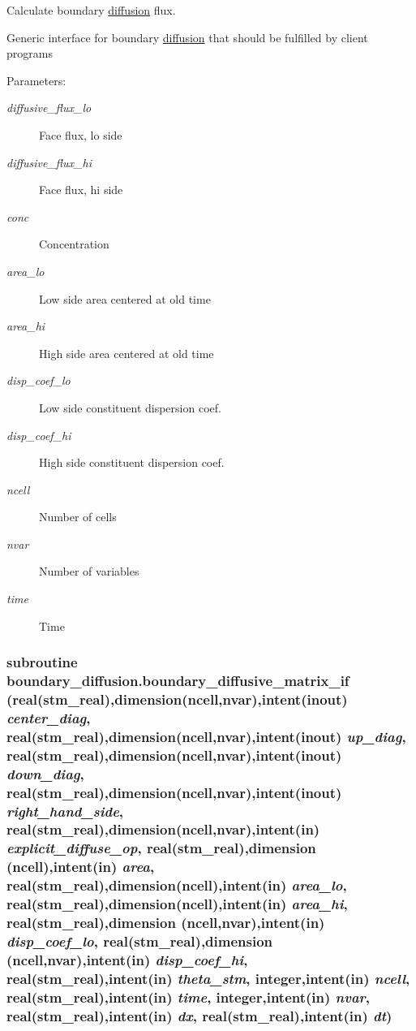 Calculate boundary \hyperlink{a00056}{diffusion} flux. 

Generic interface for boundary \hyperlink{a00056}{diffusion} that should be fulfilled by client programs \begin{Desc}
\item[Parameters:]
\begin{description}
\item[{\em diffusive\_\-flux\_\-lo}]Face flux, lo side\item[{\em diffusive\_\-flux\_\-hi}]Face flux, hi side\item[{\em conc}]Concentration \item[{\em area\_\-lo}]Low side area centered at old time\item[{\em area\_\-hi}]High side area centered at old time\item[{\em disp\_\-coef\_\-lo}]Low side constituent dispersion coef.\item[{\em disp\_\-coef\_\-hi}]High side constituent dispersion coef.\item[{\em ncell}]Number of cells\item[{\em nvar}]Number of variables\item[{\em time}]Time \end{description}
\end{Desc}
\hypertarget{a00054_beb2d03e4546ce0fc0a06c9840487f7d}{
\subsubsection[{boundary\_\-diffusive\_\-matrix\_\-if}]{\setlength{\rightskip}{0pt plus 5cm}subroutine boundary\_\-diffusion.boundary\_\-diffusive\_\-matrix\_\-if (real(stm\_\-real),dimension(ncell,nvar),intent(inout) {\em center\_\-diag}, \/  real(stm\_\-real),dimension(ncell,nvar),intent(inout) {\em up\_\-diag}, \/  real(stm\_\-real),dimension(ncell,nvar),intent(inout) {\em down\_\-diag}, \/  real(stm\_\-real),dimension(ncell,nvar),intent(inout) {\em right\_\-hand\_\-side}, \/  real(stm\_\-real),dimension(ncell,nvar),intent(in) {\em explicit\_\-diffuse\_\-op}, \/  real(stm\_\-real),dimension (ncell),intent(in) {\em area}, \/  real(stm\_\-real),dimension(ncell),intent(in) {\em area\_\-lo}, \/  real(stm\_\-real),dimension(ncell),intent(in) {\em area\_\-hi}, \/  real(stm\_\-real),dimension (ncell,nvar),intent(in) {\em disp\_\-coef\_\-lo}, \/  real(stm\_\-real),dimension (ncell,nvar),intent(in) {\em disp\_\-coef\_\-hi}, \/  real(stm\_\-real),intent(in) {\em theta\_\-stm}, \/  integer,intent(in) {\em ncell}, \/  real(stm\_\-real),intent(in) {\em time}, \/  integer,intent(in) {\em nvar}, \/  real(stm\_\-real),intent(in) {\em dx}, \/  real(stm\_\-real),intent(in) {\em dt})}}
\label{a00054_beb2d03e4546ce0fc0a06c9840487f7d}


